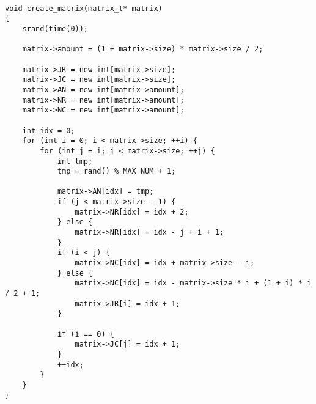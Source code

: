 \begin{center}
\captionsetup{justification=raggedright,singlelinecheck=off}
\begin{lstlisting}[label=lst:creation,caption=Алгоритм генерации верхнетреугольной упакованной в КРМ-схему хранения матрицы]

void create_matrix(matrix_t* matrix)
{
	srand(time(0));
	
	matrix->amount = (1 + matrix->size) * matrix->size / 2;
	
	matrix->JR = new int[matrix->size];
	matrix->JC = new int[matrix->size];
	matrix->AN = new int[matrix->amount];
	matrix->NR = new int[matrix->amount];
	matrix->NC = new int[matrix->amount];
	
	int idx = 0;
	for (int i = 0; i < matrix->size; ++i) {
		for (int j = i; j < matrix->size; ++j) {
			int tmp;
			tmp = rand() % MAX_NUM + 1;
			
			matrix->AN[idx] = tmp;
			if (j < matrix->size - 1) {
				matrix->NR[idx] = idx + 2;
			} else {
				matrix->NR[idx] = idx - j + i + 1;
			}
			if (i < j) {
				matrix->NC[idx] = idx + matrix->size - i;
			} else {
				matrix->NC[idx] = idx - matrix->size * i + (1 + i) * i / 2 + 1;
				matrix->JR[i] = idx + 1;
			}
			
			if (i == 0) {
				matrix->JC[j] = idx + 1;
			}
			++idx;
		}
	}
}
	    
\end{lstlisting}
\end{center}

